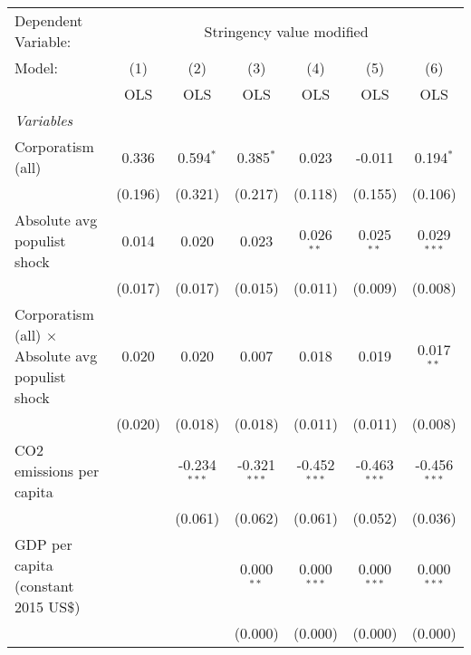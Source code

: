 
\begingroup
\centering
\begin{tabular}{lcccccc}
   \toprule
   Dependent Variable: & \multicolumn{6}{c}{Stringency value modified}\\
   Model:                                                  & (1)     & (2)            & (3)            & (4)            & (5)            & (6)\\  
                                                           &  OLS    & OLS            & OLS            & OLS            & OLS            & OLS\\  
   \midrule
   \emph{Variables}\\
   Corporatism (all)                                       & 0.336   & 0.594$^{*}$    & 0.385$^{*}$    & 0.023          & -0.011         & 0.194$^{*}$\\   
                                                           & (0.196) & (0.321)        & (0.217)        & (0.118)        & (0.155)        & (0.106)\\   
   Absolute avg populist shock                             & 0.014   & 0.020          & 0.023          & 0.026$^{**}$   & 0.025$^{**}$   & 0.029$^{***}$\\   
                                                           & (0.017) & (0.017)        & (0.015)        & (0.011)        & (0.009)        & (0.008)\\   
   Corporatism (all) $\times$ Absolute avg populist shock  & 0.020   & 0.020          & 0.007          & 0.018          & 0.019          & 0.017$^{**}$\\   
                                                           & (0.020) & (0.018)        & (0.018)        & (0.011)        & (0.011)        & (0.008)\\   
   CO2 emissions per capita                                &         & -0.234$^{***}$ & -0.321$^{***}$ & -0.452$^{***}$ & -0.463$^{***}$ & -0.456$^{***}$\\   
                                                           &         & (0.061)        & (0.062)        & (0.061)        & (0.052)        & (0.036)\\   
   GDP per capita (constant 2015 US\$)                     &         &                & 0.000$^{**}$   & 0.000$^{***}$  & 0.000$^{***}$  & 0.000$^{***}$\\   
                                                           &         &                & (0.000)        & (0.000)        & (0.000)        & (0.000)\\   

\end{tabular}
